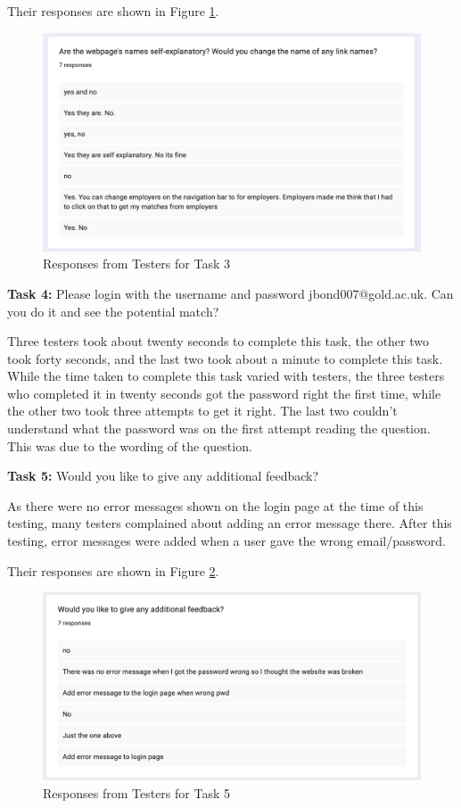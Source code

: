Their responses are shown in Figure \ref{fig:self-explanatory-pages}.

\begin{figure}
    \centering
    \includegraphics[width=140mm]{Figures/self-explanatory-pages.png}
    \caption{Responses from Testers for Task 3}
    \label{fig:self-explanatory-pages}
\end{figure}

\textbf{Task 4:} Please login with the username and password jbond007@gold.ac.uk. Can you do it and see the potential match?

Three testers took about twenty seconds to complete this task, the other two took forty seconds, and the last two took about a minute to complete this task. While the time taken to complete this task varied with testers, the three testers who completed it in twenty seconds got the password right the first time, while the other two took three attempts to get it right. The last two couldn't understand what the password was on the first attempt reading the question. This was due to the wording of the question.

\textbf{Task 5:} Would you like to give any additional feedback?

As there were no error messages shown on the login page at the time of this testing, many testers complained about adding an error message there. After this testing, error messages were added when a user gave the wrong email/password.

Their responses are shown in Figure \ref{fig:Feedback-responses}.

\begin{figure}
    \centering
    \includegraphics[width=140mm]{Figures/Feedback-responses.png}
    \caption{Responses from Testers for Task 5}
    \label{fig:Feedback-responses}
\end{figure}

